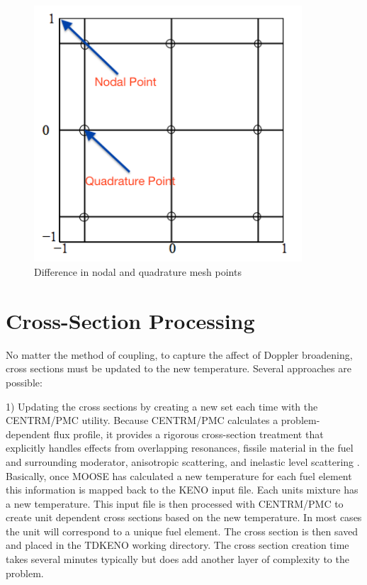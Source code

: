 \documentclass[11pt]{article}
\begin{document}
\begin{figure}
    \centering
    \includegraphics[width=10cm]{figures/nodalvsquad.png}
    \caption{Difference in nodal and quadrature mesh points}
    \label{fig:nodalquad}
\end{figure}

\section{Cross-Section Processing}
No matter the method of coupling, to capture the affect of Doppler broadening,  cross sections must be updated to the new temperature. Several approaches are possible:

1)	Updating the cross sections by creating a new set each time with the CENTRM/PMC utility. Because CENTRM/PMC calculates a problem-dependent flux profile, it provides a rigorous cross-section treatment that explicitly handles effects from overlapping resonances, fissile material in the fuel and surrounding moderator, anisotropic scattering, and inelastic level scattering \cite{bowman2007overview}.  Basically, once MOOSE has calculated a new temperature for each fuel element this information is mapped back to the KENO input file.  Each units mixture has a new temperature.  This input file is then processed with CENTRM/PMC to create unit dependent cross sections  based on the new temperature.  In most cases the unit will correspond to a unique fuel element. The cross section is then saved and placed in the TDKENO working directory.  The cross section creation time takes several minutes typically but does add another layer of complexity to the problem.  
\end{document}
